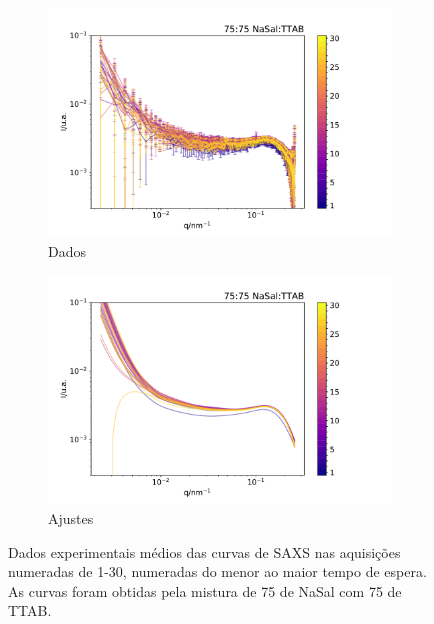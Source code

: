 	\begin{figure}[h]
		\begin{subfigure}[t]{0.5\textwidth}
			\centering
			\includegraphics[width=\textwidth]{imagens/saxs/TR_saxs_75_75_dados.pdf}
			\caption{Dados}
			\label{fig:saxs_tr_75_d}
		\end{subfigure}%
		\begin{subfigure}[t]{0.5\textwidth}
			\centering
			\includegraphics[width=\textwidth]{imagens/saxs/TR_saxs_75_75_ajuste.pdf}
			\caption{Ajustes}
			\label{fig:saxs_tr_a}
		\end{subfigure}
		\caption{Dados experimentais médios das curvas de SAXS nas aquisições numeradas de 1-30, numeradas do menor ao maior tempo de espera. As curvas foram obtidas pela mistura de 75 \mM{} de NaSal com 75 \mM{} de TTAB.}
		\label{fig:saxs_tr_75}
	\end{figure} 
	
